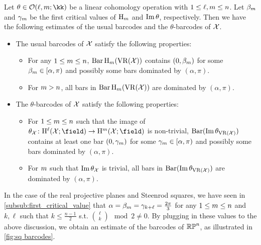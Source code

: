 Let $\theta \in \cO(\ell, \degp; \kk)$ be a linear cohomology operation with $1 \leq \ell, m \leq n$. 
Let $\beta_m$ and $\gamma_m$ be the first critical values of $\mathrm{H}_m$ and $\operatorname{Im} \theta$, respectively.
Then we have the following estimates of the usual barcodes and the $\theta$-barcodes of $\mathcal{X}$. 
\begin{itemize}
    \item The usual barcodes of $\mathcal{X}$ satisfy the following properties:
        \begin{itemize}
            \item For any $1 \leq m \leq n$, $\Hbarc[\field]{\degp}{\cX}$ contains $(0,\beta_m )$ for some $\beta_m \in [\alpha, \pi)$ and possibly some bars dominated by $(\alpha, \pi)$.
            \item For $m > n$, all bars in $\Hbarc[\field]{\degp}{\cX}$ are dominated by $(\alpha, \pi)$.
        \end{itemize}
    \item The $\theta$-barcodes of $\mathcal{X}$ satisfy the following properties: 
        \begin{itemize}
            \item For $1 \leq m \leq n$ such that the image of $\theta_\cX \colon \rH^\ell(\cX; \field) \to \rH^\degp(\cX; \field)$ is non-trivial, $\operatorname{Bar}(\operatorname{Im} \theta_{\operatorname{VR}(\mathcal{X})})$ contains at least one bar $(0,\gamma_m )$ for some $\gamma_m \in [\alpha, \pi)$ and possibly some bars dominated by $(\alpha, \pi)$. 
            \item For $m$ such that $\operatorname{Im} \theta_{\mathcal{X}}$ is trivial, all bars in $\operatorname{Bar}(\operatorname{Im} \theta_{\operatorname{VR}(\mathcal{X})})$ are dominated by $(\alpha, \pi)$. 
        \end{itemize}
\end{itemize}

\example 
In the case of the real projective planes and Steenrod squares, we have seen in \cref{subsub:first_critical_value} that $\alpha = \beta_m = \gamma_{k+\ell} = \tfrac{2\pi}{3}$ for any $1 \leq m \leq n$ and $k, \ell$ such that $k \leq \frac{n-1}{2}$ s.t. $\binom{\ell}{k} \mod 2\neq 0$. 
By plugging in these values to the above discussion, we obtain an estimate of the barcodes of $\mathbb{RP}^n$, as illustrated in \cref{fig:sq barcodes}.


